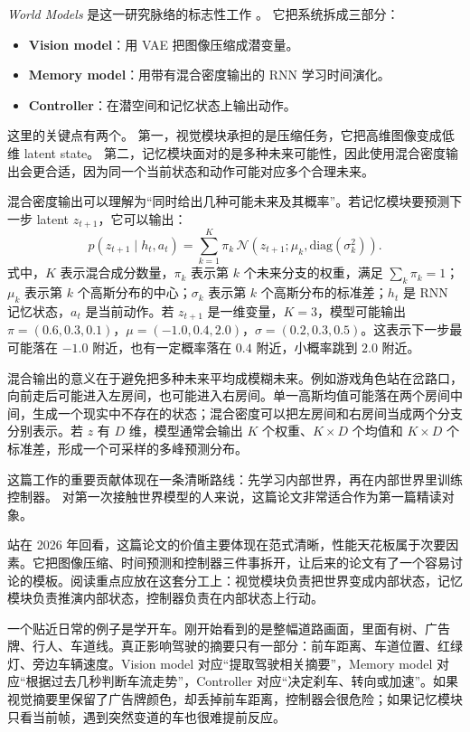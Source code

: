 \documentclass[11pt,a4paper]{ctexart}
\begin{document}
\emph{World Models} 是这一研究脉络的标志性工作 \cite{ha2018worldmodels}。
它把系统拆成三部分：

\begin{itemize}
  \item \textbf{Vision model}：用 VAE 把图像压缩成潜变量。
  \item \textbf{Memory model}：用带有混合密度输出的 RNN 学习时间演化。
  \item \textbf{Controller}：在潜空间和记忆状态上输出动作。
\end{itemize}

这里的关键点有两个。
第一，视觉模块承担的是压缩任务，它把高维图像变成低维 latent state。
第二，记忆模块面对的是多种未来可能性，因此使用混合密度输出会更合适，因为同一个当前状态和动作可能对应多个合理未来。

混合密度输出可以理解为“同时给出几种可能未来及其概率”。若记忆模块要预测下一步 latent $z_{t+1}$，它可以输出：
\begin{equation}
  p(z_{t+1}\mid h_t,a_t)=\sum_{k=1}^{K}\pi_k\,\mathcal N(z_{t+1};\mu_k,\mathrm{diag}(\sigma_k^2)).
\end{equation}
式中，$K$ 表示混合成分数量，$\pi_k$ 表示第 $k$ 个未来分支的权重，满足 $\sum_k \pi_k=1$；$\mu_k$ 表示第 $k$ 个高斯分布的中心；$\sigma_k$ 表示第 $k$ 个高斯分布的标准差；$h_t$ 是 RNN 记忆状态，$a_t$ 是当前动作。若 $z_{t+1}$ 是一维变量，$K=3$，模型可能输出 $\pi=(0.6,0.3,0.1)$，$\mu=(-1.0,0.4,2.0)$，$\sigma=(0.2,0.3,0.5)$。这表示下一步最可能落在 $-1.0$ 附近，也有一定概率落在 $0.4$ 附近，小概率跳到 $2.0$ 附近。

混合输出的意义在于避免把多种未来平均成模糊未来。例如游戏角色站在岔路口，向前走后可能进入左房间，也可能进入右房间。单一高斯均值可能落在两个房间中间，生成一个现实中不存在的状态；混合密度可以把左房间和右房间当成两个分支分别表示。若 $z$ 有 $D$ 维，模型通常会输出 $K$ 个权重、$K\times D$ 个均值和 $K\times D$ 个标准差，形成一个可采样的多峰预测分布。

这篇工作的重要贡献体现在一条清晰路线：先学习内部世界，再在内部世界里训练控制器。
对第一次接触世界模型的人来说，这篇论文非常适合作为第一篇精读对象。

站在 2026 年回看，这篇论文的价值主要体现在范式清晰，性能天花板属于次要因素。它把图像压缩、时间预测和控制器三件事拆开，让后来的论文有了一个容易讨论的模板。阅读重点应放在这套分工上：视觉模块负责把世界变成内部状态，记忆模块负责推演内部状态，控制器负责在内部状态上行动。

一个贴近日常的例子是学开车。刚开始看到的是整幅道路画面，里面有树、广告牌、行人、车道线。真正影响驾驶的摘要只有一部分：前车距离、车道位置、红绿灯、旁边车辆速度。Vision model 对应“提取驾驶相关摘要”，Memory model 对应“根据过去几秒判断车流走势”，Controller 对应“决定刹车、转向或加速”。如果视觉摘要里保留了广告牌颜色，却丢掉前车距离，控制器会很危险；如果记忆模块只看当前帧，遇到突然变道的车也很难提前反应。
\end{document}
